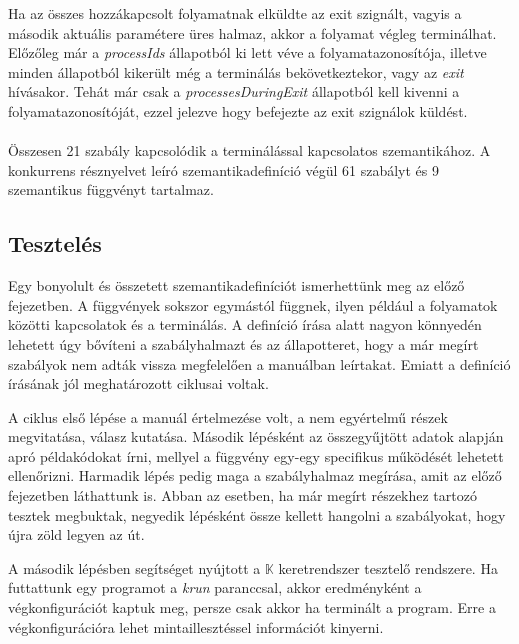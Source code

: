 

Ha az összes hozzákapcsolt folyamatnak elküldte az exit szignált, vagyis a második aktuális paramétere üres halmaz, akkor a folyamat végleg terminálhat. Előzőleg már a \textit{processIds} állapotból ki lett véve a folyamatazonosítója, illetve minden állapotból kikerült még a terminálás bekövetkeztekor, vagy az \textit{exit} hívásakor. Tehát már csak a \textit{processesDuringExit} állapotból kell kivenni a folyamatazonosítóját, ezzel jelezve hogy befejezte az exit szignálok küldést.

\paragraph{}
Összesen 21 szabály kapcsolódik a terminálással kapcsolatos szemantikához. A konkurrens résznyelvet leíró szemantikadefiníció végül 61 szabályt és 9 szemantikus függvényt tartalmaz.


\subsection{Tesztelés}

Egy bonyolult és összetett szemantikadefiníciót ismerhettünk meg az előző fejezetben. A függvények sokszor egymástól függnek, ilyen például a folyamatok közötti kapcsolatok és a terminálás. A definíció írása alatt nagyon könnyedén lehetett úgy bővíteni a szabályhalmazt és az állapotteret, hogy a már megírt szabályok nem adták vissza megfelelően a manuálban leírtakat. Emiatt a definíció írásának jól meghatározott ciklusai voltak.

A ciklus első lépése a manuál értelmezése volt, a nem egyértelmű részek megvitatása, válasz kutatása. Második lépésként az összegyűjtött adatok alapján apró példakódokat írni, mellyel a függvény egy-egy specifikus működését lehetett ellenőrizni. Harmadik lépés pedig maga a szabályhalmaz megírása, amit az előző fejezetben láthattunk is. Abban az esetben, ha már megírt részekhez tartozó tesztek megbuktak, negyedik lépésként össze kellett hangolni a szabályokat, hogy újra zöld legyen az út.

A második lépésben segítséget nyújtott a $\mathbb{K}$ keretrendszer tesztelő rendszere. Ha futtattunk egy programot a \textit{krun} paranccsal, akkor eredményként a végkonfigurációt kaptuk meg, persze csak akkor ha terminált a program. Erre a végkonfigurációra lehet mintaillesztéssel információt kinyerni.

